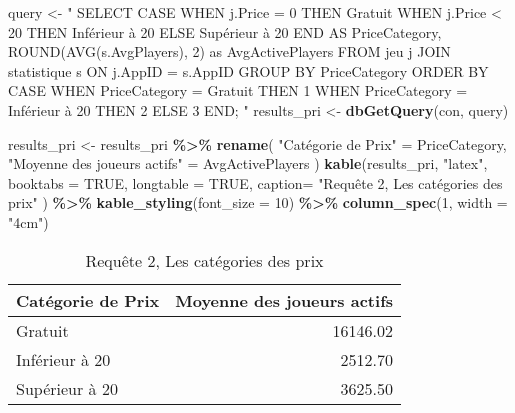 \documentclass[mstat,12pt]{unswthesis}
\newenvironment{Shaded}{\begin{snugshade}}{\end{snugshade}}
\newcommand{\AttributeTok}[1]{\textcolor[rgb]{0.13,0.29,0.53}{#1}}
\newcommand{\ConstantTok}[1]{\textcolor[rgb]{0.56,0.35,0.01}{#1}}
\newcommand{\DecValTok}[1]{\textcolor[rgb]{0.00,0.00,0.81}{#1}}
\newcommand{\FunctionTok}[1]{\textcolor[rgb]{0.13,0.29,0.53}{\textbf{#1}}}
\newcommand{\NormalTok}[1]{#1}
\newcommand{\OtherTok}[1]{\textcolor[rgb]{0.56,0.35,0.01}{#1}}
\newcommand{\SpecialCharTok}[1]{\textcolor[rgb]{0.81,0.36,0.00}{\textbf{#1}}}
\newcommand{\StringTok}[1]{\textcolor[rgb]{0.31,0.60,0.02}{#1}}
\begin{document}
\begin{Shaded}
\begin{Highlighting}[]
\NormalTok{query }\OtherTok{\textless{}{-}} \StringTok{"}
\StringTok{SELECT }
\StringTok{  CASE }
\StringTok{    WHEN j.Price = 0 THEN \textquotesingle{}Gratuit\textquotesingle{}}
\StringTok{    WHEN j.Price \textless{} 20 THEN \textquotesingle{}Inférieur à 20\textquotesingle{}}
\StringTok{    ELSE \textquotesingle{}Supérieur à 20\textquotesingle{}}
\StringTok{  END AS PriceCategory,}
\StringTok{  ROUND(AVG(s.AvgPlayers), 2) as AvgActivePlayers }
\StringTok{FROM jeu j}
\StringTok{JOIN statistique s ON j.AppID = s.AppID}
\StringTok{GROUP BY PriceCategory}
\StringTok{ORDER BY CASE }
\StringTok{           WHEN PriceCategory = \textquotesingle{}Gratuit\textquotesingle{} THEN 1}
\StringTok{           WHEN PriceCategory = \textquotesingle{}Inférieur à 20\textquotesingle{} THEN 2}
\StringTok{           ELSE 3}
\StringTok{         END;}
\StringTok{"}
\NormalTok{results\_pri }\OtherTok{\textless{}{-}} \FunctionTok{dbGetQuery}\NormalTok{(con, query)}
\end{Highlighting}
\end{Shaded}

\begin{Shaded}
\begin{Highlighting}[]
\NormalTok{results\_pri }\OtherTok{\textless{}{-}}\NormalTok{ results\_pri }\SpecialCharTok{\%\textgreater{}\%}
  \FunctionTok{rename}\NormalTok{(}
    \StringTok{"Catégorie de Prix"} \OtherTok{=}\NormalTok{ PriceCategory,}
    \StringTok{"Moyenne des joueurs actifs"} \OtherTok{=}\NormalTok{ AvgActivePlayers}
\NormalTok{  )}
\FunctionTok{kable}\NormalTok{(results\_pri, }\StringTok{"latex"}\NormalTok{, }\AttributeTok{booktabs =} \ConstantTok{TRUE}\NormalTok{, }\AttributeTok{longtable =} \ConstantTok{TRUE}\NormalTok{, }
      \AttributeTok{caption=} \StringTok{"Requête 2, Les catégories des prix"}\NormalTok{ ) }\SpecialCharTok{\%\textgreater{}\%}
  \FunctionTok{kable\_styling}\NormalTok{(}\AttributeTok{font\_size =} \DecValTok{10}\NormalTok{) }\SpecialCharTok{\%\textgreater{}\%}  
  \FunctionTok{column\_spec}\NormalTok{(}\DecValTok{1}\NormalTok{, }\AttributeTok{width =} \StringTok{"4cm"}\NormalTok{)}
\end{Highlighting}
\end{Shaded}

\begingroup\fontsize{10}{12}\selectfont

\begin{longtable}[t]{>{\raggedright\arraybackslash}p{4cm}r}
\caption{\label{tab:results-table catégorie prix}Requête 2, Les catégories des prix}\\
\toprule
Catégorie de Prix & Moyenne des joueurs actifs\\
\midrule
Gratuit & 16146.02\\
Inférieur à 20 & 2512.70\\
Supérieur à 20 & 3625.50\\
\bottomrule
\end{longtable}
\endgroup{}
\end{document}
